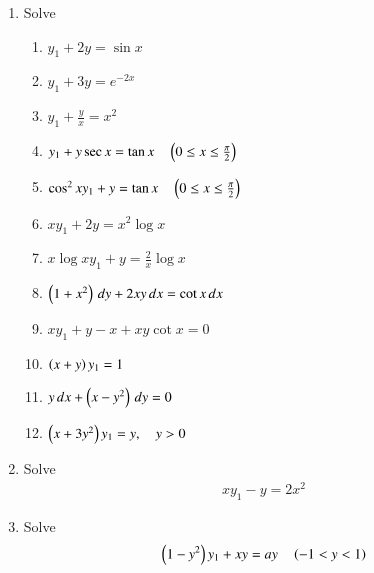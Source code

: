 \begin{enumerate}[label=\arabic*.,ref=\thesubsection.\theenumi]
\begin{enumerate}[label = (\roman*)]
\end{enumerate}
%
\item Solve
%
\begin{enumerate}[label = (\roman*)]
\item  $y_1 + 2y = \sin x$
\item  $y_1 + 3y = e^{-2x}$
\item  $y_1 + \frac{y}{x} = x^2$
\item  $y_1 + y\sec x  = \tan x \quad \left(0 \le x \le \frac{\pi}{2}\right)$
\item  $\cos^2 x y_1 + y  = \tan x \quad \left(0 \le x \le \frac{\pi}{2}\right)$
\item  $xy_1 + 2y = x^2\log x$
\item  $x\log xy_1 + y = \frac{2}{x}\log x$
\item  $\left(1+x^2\right)\, dy + 2xy \, dx = \cot x \, dx$
\item  $x y_1 + y-x + xy \cot x = 0$
\item  $\left(x+y\right) y_1 = 1$
\item  $y\, dx + \left(x-y^2\right)\, dy = 0$
\item  $\left(x+3y^2\right) y_1 = y, \quad y > 0$
\end{enumerate}
%
\item Solve 
%
\begin{align}
xy_1 -y = 2x^2
\end{align}
%
\item Solve 
%
\begin{align}
\left(1-y^2\right)y_1 +xy = ay \quad \left(-1 < y < 1\right)
\end{align}

\end{enumerate}
